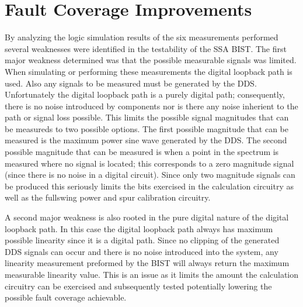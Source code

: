 \documentclass[12pt]{report}
\begin{document}
\section{Fault Coverage Improvements}
By analyzing the logic simulation results of the six measurements performed several weaknesses were identified in the testability of the SSA BIST.  The first major weakness determined was that the possible measurable signals was limited.  When simulating or performing these measurements the digital loopback path is used.  Also any signals to be measured must be generated by the DDS. Unfortunately the digital loopback path is a purely digital path; consequently, there is no noise introduced by components nor is there any noise inherient to the path or signal loss possible.  This limits the possible signal magnitudes that can be measureds to two possible options.  The first possible magnitude that can be measured is the maximum power sine wave generated by the DDS.  The second possible magnitude that can be measured is when a point in the spectrum is measured where no signal is located; this corresponds to a zero magnitude signal (since there is no noise in a digital circuit).  Since only two magnitude signals can be produced this seriously limits the bits exercised in the calculation circuitry as well as the fullswing power and spur calibration circuitry. 

A second major weakness is also rooted in the pure digital nature of the digital loopback path.  In this case the digital loopback path always has maximum possible linearity since it is a digital path.  Since no clipping of the generated DDS signals can occur and there is no noise introduced into the system, any linearity measurement preformed by the BIST will always return the maximum measurable linearity value.  This is an issue as it limits the amount the calculation circuitry can be exercised and subsequently tested potentially lowering the possible fault coverage achievable.
\end{document}
